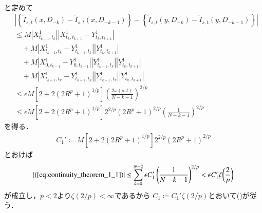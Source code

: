 \begin{prf}
\begin{description}
\begin{align}
				\end{align}
				と定めて
				\begin{align}
					&\left| \left\{ \tilde{I}_{s,t}(x,D_{-k}) - \tilde{I}_{s,t}(x,D_{-k-1}) \right\} - 
						\left\{ \tilde{I}_{s,t}(y,D_{-k}) - \tilde{I}_{s,t}(y,D_{-k-1}) \right\} \right| \\
					&\leq M \left|X^1_{t_{k-1},t_k}\right|\left| X^1_{t_k,t_{k+1}} - Y^1_{t_k,t_{k+1}} \right| \\
						&\quad + M \left| X^1_{t_{k-1},t_k} - Y^1_{t_{k-1},t_k} \right| \left| Y^1_{t_k,t_{k+1}} \right| \\
						&\quad + M \left| X^1_{0,t_{k-1}} - Y^1_{0,t_{k-1}} \right| \left| Y^1_{t_{k-1},t_k} \right|\left| Y^1_{t_k,t_{k+1}} \right| \\
						&\quad + M \left| X^1_{t_{k-1},t_k} - Y^1_{t_{k-1},t_k} \right| \left| Y^1_{t_{k-1},t_k} \right|\left| Y^1_{t_k,t_{k+1}} \right| \\
					&\leq \epsilon M \left[2 + 2 \left( 2 R^p + 1 \right)^{1/p} \right] \left( \frac{2\omega(s,t)}{N-k-1} \right)^{2/p} \\
					&\leq \epsilon M \left[2 + 2 \left( 2 R^p + 1 \right)^{1/p} \right] 2^{2/p} \left( 2 R^p + 1 \right)^{2/p} \left( \frac{1}{N-k-1} \right)^{2/p}
				\end{align}
				を得る．
				\begin{align}
					C_1' \coloneqq  M \left[2 + 2 \left( 2 R^p + 1 \right)^{1/p} \right] 2^{2/p} \left( 2 R^p + 1 \right)^{2/p}
				\end{align}
				とおけば
				\begin{align}
					|(\refeq{eq:continuity_theorem_1_1})| \leq
					\sum_{k=0}^{N-2} \epsilon C_1' \left( \frac{1}{N-k-1} \right)^{2/p}
					< \epsilon C_1' \zeta \biggl( \frac{2}{p} \biggr)
				\end{align}
				が成立し，$p < 2$より$\zeta(2/p) < \infty$であるから
				$C_1 \coloneqq C_1' \zeta(2/p)$とおいて()が従う．
			

\end{description}
\end{prf}
